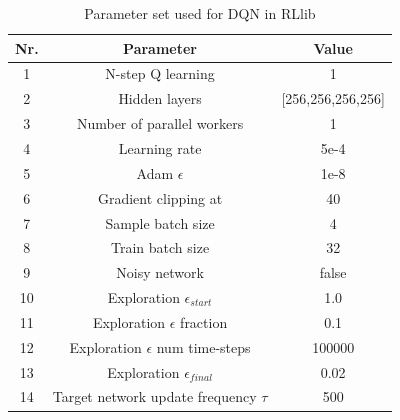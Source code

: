 \documentclass[12pt,a4paper]{article}
\begin{document}
\begin{table}
    \begin{center}
        \begin{tabular}{| c | c | c |}
            \hline
            Nr. & {\bf Parameter} & {\bf Value} \\
            \hline
            \hline
            1 & N-step Q learning & 1 \\
            \hline
            2 & Hidden layers & [256,256,256,256] \\
            \hline
            3 & Number of parallel workers & 1 \\
            \hline
            \hline
            4 & Learning rate & 5e-4 \\
            \hline
            5 &Adam $\epsilon$ & 1e-8 \\
            \hline
            6 & Gradient clipping at & 40 \\
            \hline
            7 & Sample batch size & 4 \\
            \hline
            8 & Train batch size & 32 \\
            \hline
            9 & Noisy network & false \\
            \hline
            \hline
            10 & Exploration $\epsilon_{start}$ & 1.0 \\
            \hline
            11 & Exploration $\epsilon$ fraction & 0.1 \\
            \hline
            12 & Exploration $\epsilon$ num time-steps & 100000 \\
            \hline
            13 & Exploration $\epsilon_{final}$ & 0.02 \\
            \hline
            14 & Target network update frequency $\tau$ & 500 \\
            \hline
        \end{tabular}
        \caption{Parameter set used for DQN in RLlib}
        \label{tab:dqn_params}
    \end{center}
\end{table} 
\end{document}
